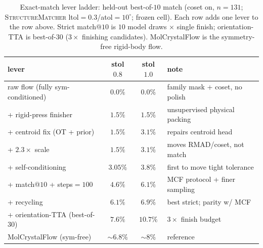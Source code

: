 \documentclass[journal=acsodf,manuscript=article]{achemso}
\begin{document}
\begin{table}[t]\centering
\caption{Exact-match lever ladder: held-out best-of-$10$ match (coset on, $n{=}131$;
\textsc{StructureMatcher} ltol$=0.3$/atol$=10^\circ$; frozen cell). Each row adds
one lever to the row above. Strict match@$10$ is $10$ model draws $\times$ single
finish; orientation-TTA is best-of-$30$ ($3\times$ finishing candidates).
MolCrystalFlow is the symmetry-free rigid-body flow.}
\label{tab:ladder}
\begin{tabular}{lccl}\toprule
lever & stol $0.8$ & stol $1.0$ & note \\\midrule
raw flow (fully sym-conditioned)        & $0.0\%$ & $0.0\%$ & family mask + coset, no polish \\
\quad + rigid-press finisher            & $1.5\%$ & $1.5\%$ & unsupervised physical packing \\
\quad + centroid fix (OT + prior)       & $1.5\%$ & $3.1\%$ & repairs centroid head \\
\quad + $2.3\times$ scale               & $1.5\%$ & $3.1\%$ & moves RMAD/coset, not match \\
\quad + self-conditioning               & $3.05\%$& $3.8\%$ & first to move tight tolerance \\
\quad + match@$10$ + steps$=100$        & $4.6\%$ & $6.1\%$ & MCF protocol + finer sampling \\
\quad + recycling                       & $\mathbf{6.1\%}$ & $\mathbf{6.9\%}$ & best strict; parity w/ MCF \\
\quad + orientation-TTA (best-of-$30$)  & $7.6\%$ & $\mathbf{10.7\%}$ & $3\times$ finish budget \\\midrule
MolCrystalFlow (sym-free)\cite{zeng2026molcrystalflow} & $\sim\!6.8\%$ & $\sim\!8\%$ & reference \\
\bottomrule
\end{tabular}
\end{table}
\end{document}
